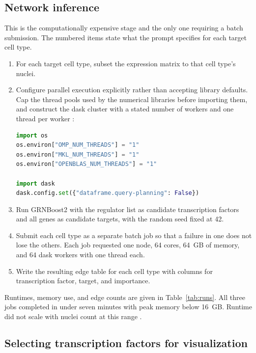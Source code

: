 \subsection{Network inference}

This is the computationally expensive stage and the only one requiring a batch submission. The numbered items state what the prompt specifies for each target cell type.

\begin{enumerate}[leftmargin=*]
\item For each target cell type, subset the expression matrix to that cell type's nuclei.

\item Configure parallel execution explicitly rather than accepting library defaults. Cap the thread pools used by the numerical libraries before importing them, and construct the dask \cite{dask2016} cluster with a stated number of workers and one thread per worker :


\begin{lstlisting}[language=Python]
import os
os.environ["OMP_NUM_THREADS"] = "1"
os.environ["MKL_NUM_THREADS"] = "1"
os.environ["OPENBLAS_NUM_THREADS"] = "1"

import dask
dask.config.set({"dataframe.query-planning": False})
\end{lstlisting}

\item Run GRNBoost2 with the regulator list as candidate transcription factors and all genes as candidate targets, with the random seed fixed at 42.

\item Submit each cell type as a separate batch job so that a failure in one does not lose the others. Each job requested one node, 64 cores, 64~GB of memory, and 64 dask workers with one thread each.

\item Write the resulting edge table for each cell type with columns for transcription factor, target, and importance.
\end{enumerate}

Runtimes, memory use, and edge counts are given in Table~\ref{tab:runs}. All three jobs completed in under seven minutes with peak memory below 16~GB. Runtime did not scale with nuclei count at this range .

\subsection{Selecting transcription factors for visualization}


